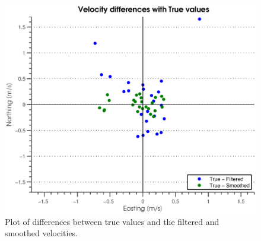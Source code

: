 \begin{figure}[h]
	\centering
		\includegraphics[width=\MyWidth]{Figures/diffPlotsVelocity.eps}
	\caption{Plot of differences between true values and the filtered and smoothed velocities.}
	\label{fig:Figures_diffPlotsVelocity}
\end{figure} %
